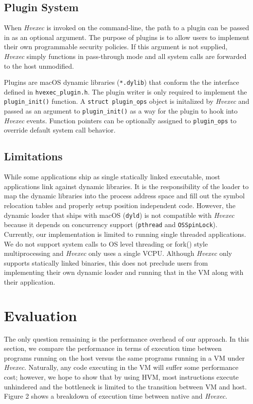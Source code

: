 \documentclass{article}
\newcommand{\PROJNAME}{\textit{Hvexec}}
\begin{document}
\subsection{Plugin System}
When \PROJNAME{} is invoked on the command-line, the path to a plugin can be passed in as an optional argument.
The purpose of plugins is to allow users to implement their own programmable security policies.
If this argument is not supplied, \PROJNAME{} simply functions in pass-through mode and all system calls are forwarded to the host unmodified.

Plugins are macOS dynamic libraries (\texttt{*.dylib}) that conform the the interface defined in \texttt{hvexec\_plugin.h}.
The plugin writer is only required to implement the \texttt{plugin\_init()} function.
A \texttt{struct plugin\_ops} object is initalized by \PROJNAME{} and passed as an argument to \texttt{plugin\_init()} as a way for the plugin to hook into \PROJNAME{} events.
Function pointers can be optionally assigned to \texttt{plugin\_ops} to override default system call behavior.

\subsection{Limitations}
While some applications ship as single statically linked executable, most applications link against dynamic libraries.
It is the responsibility of the loader to map the dynamic libraries into the process address space and fill out the
symbol relocation tables and properly setup position independent code.
However, the dynamic loader that ships with macOS (\texttt{dyld}) is not compatible with \PROJNAME{} because it depends on concurrency support (\texttt{pthread} and \texttt{OSSpinLock}).
Currently, our implementation is limited to running single threaded applications.
We do not support system calls to OS level threading or fork() style multiprocessing and \PROJNAME{} only uses a single VCPU.
Although \PROJNAME{} only supports statically linked binaries, this does not preclude users from implementing their own dynamic loader and running that in the VM along with their application.


\section{Evaluation}
The only question remaining is the performance overhead of our approach.
In this section, we compare the performance in terms of execution time between programs running on the host versus the same programs running in a VM under \PROJNAME{}.
Naturally, any code executing in the VM will suffer some performance cost; however, we hope to show that by using HVM, most instructions execute unhindered and the bottleneck is limited to the transition between VM and host.
Figure 2 shows a breakdown of execution time between native and \PROJNAME{}.
\end{document}
